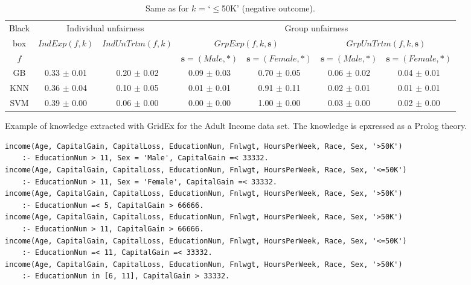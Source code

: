 \documentclass[letterpaper]{article} %
\begin{document}
\begin{table*}[t!]
	\begin{center}{\caption{Same as  for $k$ = `$\leq$50K' (negative outcome).}\label{tab:res0}}
		\begin{tabular}{c|c|c|c|c|c|c}
			\toprule
			Black & \multicolumn{2}{c|}{Individual unfairness} & \multicolumn{4}{c}{Group unfairness} \\
			box & $IndExp(f,k)$ & $IndUnTrtm(f,k)$ & \multicolumn{2}{c|}{$GrpExp(f, k, \boldsymbol{s})$} & \multicolumn{2}{c}{$GrpUnTrtm(f, k, \boldsymbol{s})$} \\
			$f$ & & & $\boldsymbol{s} = (Male, *)$ & $\boldsymbol{s} = (Female, *)$ & $\boldsymbol{s} = (Male, *)$ & $\boldsymbol{s} = (Female, *)$ \\
			\midrule					
			GB & 0.33 $\pm$ 0.01 & 0.20 $\pm$ 0.02 & 0.09 $\pm$ 0.03 & 0.70 $\pm$ 0.05 & 0.06 $\pm$ 0.02 & 0.04 $\pm$ 0.01 \\
			KNN & 0.36 $\pm$ 0.04 & 0.10 $\pm$ 0.05 & 0.01 $\pm$ 0.01 & 0.91 $\pm$ 0.11 & 0.02 $\pm$ 0.01 & 0.01 $\pm$ 0.01 \\
			SVM & 0.39 $\pm$ 0.00 & 0.06 $\pm$ 0.00 & 0.00 $\pm$ 0.00 & 1.00 $\pm$ 0.00 & 0.03 $\pm$ 0.00 & 0.02 $\pm$ 0.00 \\
			\bottomrule
		\end{tabular}
	\end{center}
\end{table*}

\begin{listing*}[t!]
	\caption{Example of knowledge extracted with GridEx for the Adult Income data set. The knowledge is epxressed as a Prolog theory.}\label{lst:rules}
	\begin{lstlisting}[]
income(Age, CapitalGain, CapitalLoss, EducationNum, Fnlwgt, HoursPerWeek, Race, Sex, '>50K') 
    :- EducationNum > 11, Sex = 'Male', CapitalGain =< 33332.
income(Age, CapitalGain, CapitalLoss, EducationNum, Fnlwgt, HoursPerWeek, Race, Sex, '<=50K') 
    :- EducationNum > 11, Sex = 'Female', CapitalGain =< 33332.
income(Age, CapitalGain, CapitalLoss, EducationNum, Fnlwgt, HoursPerWeek, Race, Sex, '>50K') 
    :- EducationNum =< 5, CapitalGain > 66666.
income(Age, CapitalGain, CapitalLoss, EducationNum, Fnlwgt, HoursPerWeek, Race, Sex, '>50K') 
    :- EducationNum > 11, CapitalGain > 66666.
income(Age, CapitalGain, CapitalLoss, EducationNum, Fnlwgt, HoursPerWeek, Race, Sex, '<=50K') 
    :- EducationNum =< 11, CapitalGain =< 33332.
income(Age, CapitalGain, CapitalLoss, EducationNum, Fnlwgt, HoursPerWeek, Race, Sex, '>50K') 
    :- EducationNum in [6, 11], CapitalGain > 33332.
	\end{lstlisting}
\end{listing*}
\end{document}
